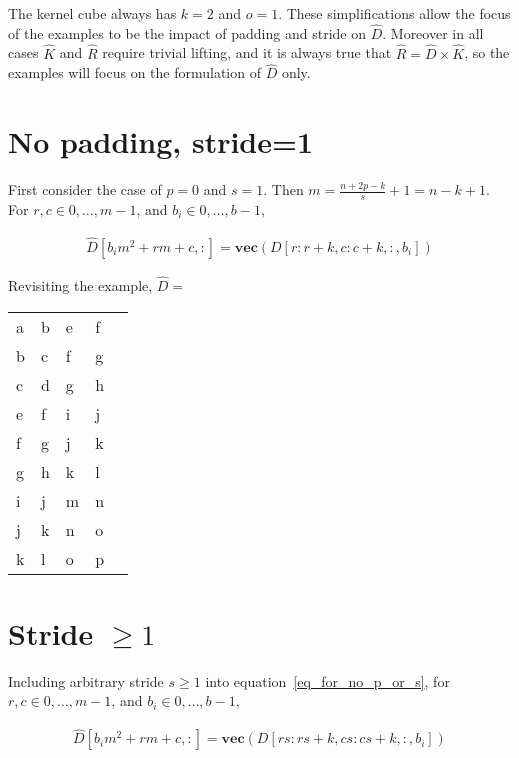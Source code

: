 \documentclass{article}
\begin{document}
The kernel cube always has $k=2$ and $o=1$. These simplifications allow the focus of the examples to be the impact of padding and stride on $\widehat{D}$. Moreover in all cases $\widehat{K}$ and $\widehat{R}$ require trivial lifting, and it is always true that $\widehat{R} = \widehat{D} \times \widehat{K}$, so the examples will focus on the formulation of $\widehat{D}$ only.


\section{No padding, stride=1}

First consider the case of $p=0$ and $s=1$. Then $m = \frac{n+2p-k}{s}+1 = n-k+1$. For $r, c \in 0, \ldots, m-1$, and $b_i \in 0, \ldots, b-1$,

\begin{equation} \label{eq_for_no_p_or_s}
\begin{split}
\widehat{D}[b_i m^2 + rm + c, :] = \textbf{vec}(D[r:r+k,c:c+k,:,b_i])
\end{split}
\end{equation}

Revisiting the example, $\widehat{D} =$

\begin{table}[h]
\centering
\begin{tabular}{lllll}
a & b & e & f \\
b & c & f & g \\
c & d & g & h \\
e & f & i & j \\
f & g & j & k \\
g & h & k & l \\
i & j & m & n \\
j & k & n & o \\
k & l & o & p
\end{tabular}
\end{table}

\section{Stride $\geq 1$}

Including arbitrary stride $s \geq 1$ into equation~\ref{eq_for_no_p_or_s}, for $r, c \in 0, \ldots, m-1$, and $b_i \in 0, \ldots, b-1$,

\begin{equation} \label{eq_for_no_p}
\begin{split}
\widehat{D}[b_i m^2 + rm + c, :] = \textbf{vec}(D[rs:rs+k,cs:cs+k,:,b_i])
\end{split}
\end{equation}
\end{document}
